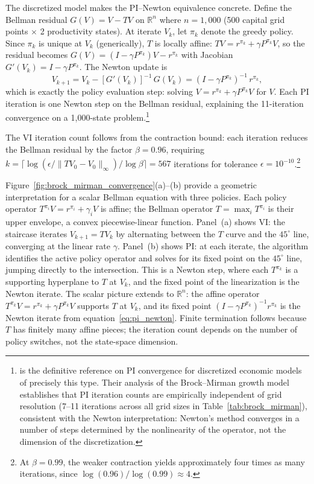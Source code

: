 The discretized model makes the PI--Newton equivalence concrete. Define the Bellman residual $G(V) = V - TV$ on $\mathbb{R}^n$ where $n = 1{,}000$ (500 capital grid points $\times$ 2 productivity states). At iterate $V_k$, let $\pi_k$ denote the greedy policy. Since $\pi_k$ is unique at $V_k$ (generically), $T$ is locally affine: $TV = r^{\pi_k} + \gamma P^{\pi_k} V$, so the residual becomes $G(V) = (I - \gamma P^{\pi_k})V - r^{\pi_k}$ with Jacobian $G'(V_k) = I - \gamma P^{\pi_k}$. The Newton update is
\begin{equation}
V_{k+1} = V_k - [G'(V_k)]^{-1}\, G(V_k) = (I - \gamma P^{\pi_k})^{-1}\, r^{\pi_k},
\label{eq:pi_newton}
\end{equation}
which is exactly the policy evaluation step: solving $V = r^{\pi_k} + \gamma P^{\pi_k} V$ for $V$. Each PI iteration is one Newton step on the Bellman residual, explaining the 11-iteration convergence on a 1,000-state problem.\footnote{\citet{santos2004} is the definitive reference on PI convergence for discretized economic models of precisely this type. Their analysis of the Brock--Mirman growth model establishes that PI iteration counts are empirically independent of grid resolution (7--11 iterations across all grid sizes in Table~\ref{tab:brock_mirman}), consistent with the Newton interpretation: Newton's method converges in a number of steps determined by the nonlinearity of the operator, not the dimension of the discretization.}

The VI iteration count follows from the contraction bound: each iteration reduces the Bellman residual by the factor $\beta = 0.96$, requiring $k = \lceil \log(\epsilon / \|TV_0 - V_0\|_\infty) / \log \beta \rceil = 567$ iterations for tolerance $\epsilon = 10^{-10}$.\footnote{At $\beta = 0.99$, the weaker contraction yields approximately four times as many iterations, since $\log(0.96)/\log(0.99) \approx 4$.}

Figure~\ref{fig:brock_mirman_convergence}(a)--(b) provide a geometric interpretation for a scalar Bellman equation with three policies. Each policy operator $T^{\pi_i} V = r^{\pi_i} + \gamma_i V$ is affine; the Bellman operator $T = \max_i T^{\pi_i}$ is their upper envelope, a convex piecewise-linear function. Panel~(a) shows VI: the staircase iterates $V_{k+1} = TV_k$ by alternating between the $T$ curve and the $45^\circ$ line, converging at the linear rate $\gamma$. Panel~(b) shows PI: at each iterate, the algorithm identifies the active policy operator and solves for its fixed point on the $45^\circ$ line, jumping directly to the intersection. This is a Newton step, where each $T^{\pi_k}$ is a supporting hyperplane to $T$ at $V_k$, and the fixed point of the linearization is the Newton iterate. The scalar picture extends to $\mathbb{R}^n$: the affine operator $T^{\pi_k} V = r^{\pi_k} + \gamma P^{\pi_k} V$ supports $T$ at $V_k$, and its fixed point $(I - \gamma P^{\pi_k})^{-1} r^{\pi_k}$ is the Newton iterate from equation~\eqref{eq:pi_newton}. Finite termination follows because $T$ has finitely many affine pieces; the iteration count depends on the number of policy switches, not the state-space dimension.

